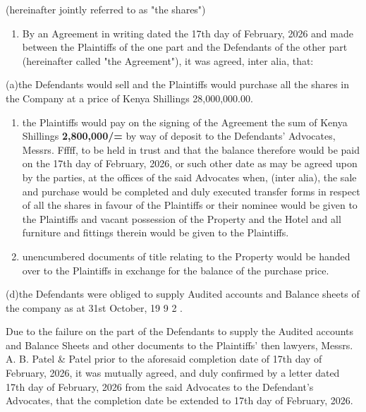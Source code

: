 \documentclass[12pt,a4paper]{article}
\begin{document}
\begin{justify}(hereinafter jointly referred to as "the shares")\end{justify}


\begin{enumerate}
\item By an Agreement in writing dated the 17th day of February, 2026 and made between the Plaintiffs of the one part and the Defendants of the other part (hereinafter called "the Agreement"), it was agreed, inter alia, that:

\end{enumerate}
\begin{justify}(a)the Defendants would sell and the Plaintiffs would purchase all the shares in the Company at a price of Kenya Shillings 28,000,000.00.\end{justify}


\begin{enumerate}
\item the Plaintiffs would pay on the signing of the Agreement the sum of Kenya Shillings \textbf{2,800,000/= }by way of deposit to the Defendants' Advocates, Messrs.  Fffff, to be held in trust and that the balance therefore would be paid on the 17th day of February, 2026, or such other date as may be agreed upon by\textbf{ }the parties, at the offices of the said Advocates when, (inter alia), the sale and purchase would be completed and duly executed transfer forms in respect of all the shares in favour of the Plaintiffs or their nominee would be given to the Plaintiffs and vacant possession of the Property and the Hotel and all furniture and fittings therein would be given to the Plaintiffs.

\item unencumbered documents of title relating to the Property would be handed over to the Plaintiffs in exchange for the balance of the purchase price.

\end{enumerate}
\begin{justify}(d)the Defendants were obliged to supply Audited accounts and Balance sheets of the company as at 31st October, 19 9 2 .\end{justify}


\begin{justify}Due to the failure on the part of the Defendants to supply the Audited accounts and Balance Sheets and other documents to the Plaintiffs' then lawyers, Messrs.  A. B. Patel \& Patel prior to the aforesaid completion date of 17th day of February, 2026, it was mutually agreed, and duly confirmed by a letter dated 17th day of February, 2026 from the said Advocates to the Defendant’s Advocates, that the completion date be extended to 17th day of February, 2026.\end{justify}
\end{document}
